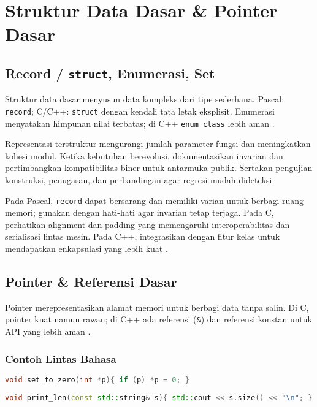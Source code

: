 \documentclass[../main.tex]{subfiles}
\begin{document}
\chapter{Struktur Data Dasar \& Pointer Dasar}
\section{Record / \texttt{struct}, Enumerasi, Set}
Struktur data dasar menyusun data kompleks dari tipe sederhana. Pascal: \texttt{record}; C/C++: \texttt{struct} dengan kendali tata letak eksplisit. Enumerasi menyatakan himpunan nilai terbatas; di C++ \texttt{enum class} lebih aman \parencite{pascal-structs,c-struct,cpp-struct-class,cpp-enum-class}.

Representasi terstruktur mengurangi jumlah parameter fungsi dan meningkatkan kohesi modul. Ketika kebutuhan berevolusi, dokumentasikan invarian dan pertimbangkan kompatibilitas biner untuk antarmuka publik. Sertakan pengujian konstruksi, penugasan, dan perbandingan agar regresi mudah dideteksi.

Pada Pascal, \texttt{record} dapat bersarang dan memiliki varian untuk berbagi ruang memori; gunakan dengan hati-hati agar invarian tetap terjaga. Pada C, perhatikan alignment dan padding yang memengaruhi interoperabilitas dan serialisasi lintas mesin. Pada C++, integrasikan dengan fitur kelas untuk mendapatkan enkapsulasi yang lebih kuat \parencite{pascal-structs,c-struct,cpp-struct-class}.

\section{Pointer \& Referensi Dasar}
Pointer merepresentasikan alamat memori untuk berbagi data tanpa salin. Di C, pointer kuat namun rawan; di C++ ada referensi (\texttt{\&}) dan referensi konstan untuk API yang lebih aman \parencite{gnu-c-manual,cpp-reference}.

\subsection{Contoh Lintas Bahasa}
\begin{lstlisting}[language=C, caption={Pointer dasar di C}]
void set_to_zero(int *p){ if (p) *p = 0; }
\end{lstlisting}

\begin{lstlisting}[language=C++, caption={Referensi konstan di C++}]
void print_len(const std::string& s){ std::cout << s.size() << "\n"; }
\end{lstlisting}
\end{document}
